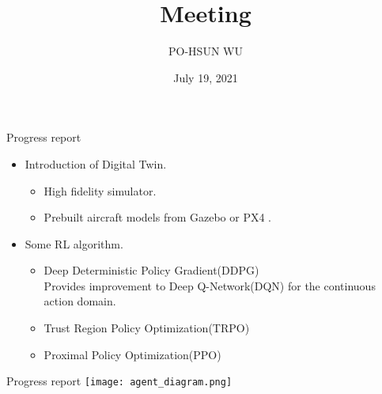 \documentclass{beamer}
\date{July 19, 2021}
\title{Meeting}
\author{PO-HSUN WU}
\begin{document}
    \frame{\titlepage}

    \begin{frame}{Progress report}
    \begin{itemize}
        \item Introduction of Digital Twin.
        \begin{itemize}
            \item High fidelity simulator.
            \item Prebuilt aircraft models from Gazebo or PX4 .
        \end{itemize}
        \item Some RL algorithm.
        \begin{itemize}
            \item Deep Deterministic Policy Gradient(DDPG)\\
            \hspace{1em}Provides improvement to Deep Q-Network(DQN) for the continuous action domain.
            \item Trust Region Policy Optimization(TRPO)
            \item Proximal Policy Optimization(PPO)
        \end{itemize}
    \end{itemize}
    \end{frame}

    \begin{frame}{Progress report}
        \centering
        \texttt{[image: agent\_diagram.png]}
    \end{frame}
\end{document}
